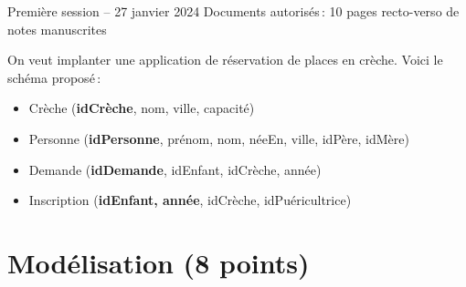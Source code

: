 %
{Première session  -- 27 janvier 2024}%
{Documents autorisés\,: 10 pages recto-verso de notes manuscrites}%

On veut implanter une application de réservation de places en crèche. Voici le schéma proposé\,:

\begin{itemize}
  \item Crèche (\textbf{idCrèche}, nom, ville, capacité)
   \item Personne (\textbf{idPersonne}, prénom, nom, néeEn, ville, idPère, idMère)
  \item Demande (\textbf{idDemande}, idEnfant, idCrèche, année)
  \item Inscription (\textbf{idEnfant, année}, idCrèche, idPuéricultrice)
   
\end{itemize}

\section{Modélisation (8 points)}



